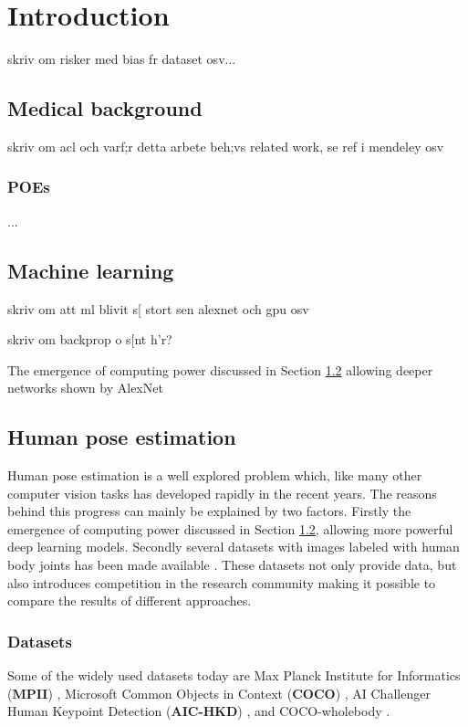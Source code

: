 \chapter{Introduction}

skriv om risker med bias fr dataset osv...

\section{Medical background}
skriv om acl och varf;r detta arbete beh;vs
related work, se ref i mendeley osv
\subsection{POEs}
...

\section{Machine learning} \label{sec:ML}
skriv om att ml blivit s[ stort sen alexnet och gpu osv

skriv om backprop o s[nt h'r?

The emergence of computing power discussed in Section \ref{sec:ML} allowing deeper networks shown by AlexNet \cite{Krizhevsky2012}

\section{Human pose estimation} \label{sec:pose_estimation}
Human pose estimation is a well explored problem which, like many other computer vision tasks has developed rapidly in the recent years. The reasons behind this progress can mainly be explained by two factors. Firstly the emergence of computing power discussed in Section \ref{sec:ML}, allowing more powerful deep learning models. Secondly several datasets with images labeled with human body joints has been made available \cite{Chen2020}. These datasets not only provide data, but also introduces competition in the research community making it possible to compare the results of different approaches.

\subsection{Datasets} \label{sec:datasets}
Some of the widely used datasets today are Max Planck Institute for Informatics (\textbf{MPII}) \cite{Andriluka2014}, Microsoft Common Objects in Context (\textbf{COCO}) \cite{Lin2014}, AI Challenger Human Keypoint Detection (\textbf{AIC-HKD}) \cite{Wu2017}, and COCO-wholebody \cite{Jin2020}.%


